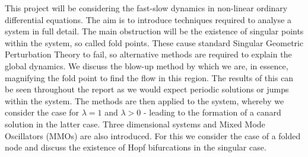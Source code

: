 This project will be considering the fast-slow dynamics in non-linear ordinary differential equations. The aim is to introduce techniques required to analyse a system in full detail. The main obstruction will be the existence of singular points within the system, so called fold points. These cause standard Singular Geometric Perturbation Theory to fail, so alternative methods are required to explain the global dynamics. We discuss the blow-up method by which we are, in essence, magnifying the fold point to find the flow in this region. The results of this can be seen throughout the report as we would expect periodic solutions or jumps within the system. The methods are then applied to the \vdp system, whereby we consider the case for $ \lambda=1 $ and $ \lambda>0 $ - leading to the formation of a canard solution in the latter case. Three dimensional systems and Mixed Mode Oscillators (MMOs) are also introduced. For this we consider the case of a folded node and discuss the existence of Hopf bifurcations in the singular case.  